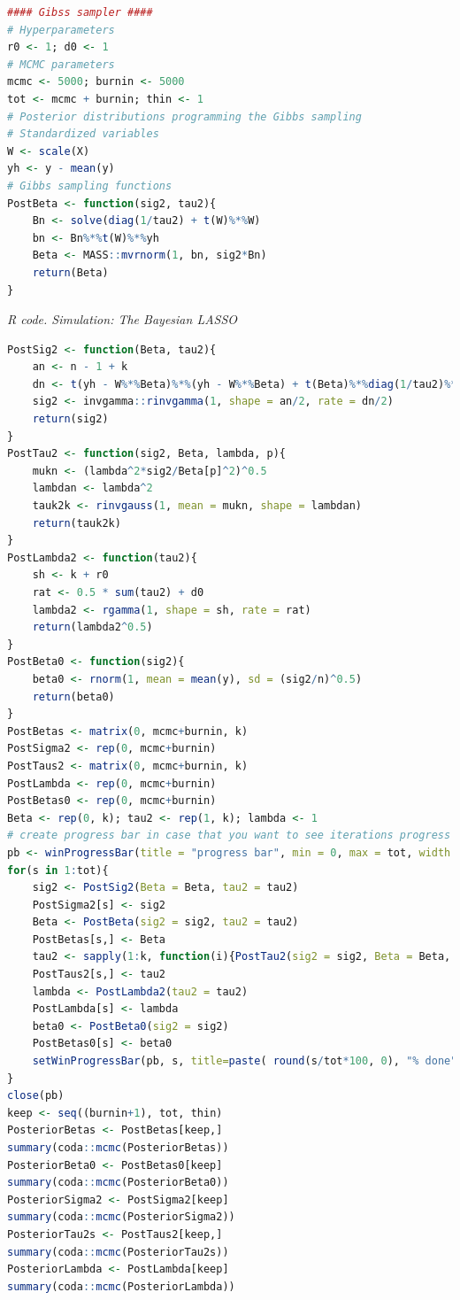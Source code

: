 \begin{enumerate}[leftmargin=*]
\begin{tcolorbox}[enhanced,width=4.67in,center upper,
	fontupper=\large\bfseries,drop shadow southwest,sharp corners]
\begin{VF}
\begin{lstlisting}[language=R]
#### Gibss sampler ####
# Hyperparameters
r0 <- 1; d0 <- 1
# MCMC parameters
mcmc <- 5000; burnin <- 5000
tot <- mcmc + burnin; thin <- 1
# Posterior distributions programming the Gibbs sampling
# Standardized variables
W <- scale(X)
yh <- y - mean(y)
# Gibbs sampling functions
PostBeta <- function(sig2, tau2){
	Bn <- solve(diag(1/tau2) + t(W)%*%W)
	bn <- Bn%*%t(W)%*%yh
	Beta <- MASS::mvrnorm(1, bn, sig2*Bn)
	return(Beta)
}
\end{lstlisting}
	\end{VF}
\end{tcolorbox} 
 
\begin{tcolorbox}[enhanced,width=4.67in,center upper,
	fontupper=\large\bfseries,drop shadow southwest,sharp corners]
	\textit{R code. Simulation: The Bayesian LASSO}
	\begin{VF}
		\begin{lstlisting}[language=R]
PostSig2 <- function(Beta, tau2){
	an <- n - 1 + k
	dn <- t(yh - W%*%Beta)%*%(yh - W%*%Beta) + t(Beta)%*%diag(1/tau2)%*%Beta
	sig2 <- invgamma::rinvgamma(1, shape = an/2, rate = dn/2)
	return(sig2)
}
PostTau2 <- function(sig2, Beta, lambda, p){
	mukn <- (lambda^2*sig2/Beta[p]^2)^0.5
	lambdan <- lambda^2
	tauk2k <- rinvgauss(1, mean = mukn, shape = lambdan)
	return(tauk2k)
}
PostLambda2 <- function(tau2){
	sh <- k + r0
	rat <- 0.5 * sum(tau2) + d0
	lambda2 <- rgamma(1, shape = sh, rate = rat)
	return(lambda2^0.5)
}
PostBeta0 <- function(sig2){
	beta0 <- rnorm(1, mean = mean(y), sd = (sig2/n)^0.5)
	return(beta0)
}
PostBetas <- matrix(0, mcmc+burnin, k)
PostSigma2 <- rep(0, mcmc+burnin)
PostTaus2 <- matrix(0, mcmc+burnin, k)
PostLambda <- rep(0, mcmc+burnin)
PostBetas0 <- rep(0, mcmc+burnin)
Beta <- rep(0, k); tau2 <- rep(1, k); lambda <- 1
# create progress bar in case that you want to see iterations progress
pb <- winProgressBar(title = "progress bar", min = 0, max = tot, width = 300)
for(s in 1:tot){
	sig2 <- PostSig2(Beta = Beta, tau2 = tau2)
	PostSigma2[s] <- sig2
	Beta <- PostBeta(sig2 = sig2, tau2 = tau2)
	PostBetas[s,] <- Beta
	tau2 <- sapply(1:k, function(i){PostTau2(sig2 = sig2, Beta = Beta, lambda = lambda, p = i)})
	PostTaus2[s,] <- tau2
	lambda <- PostLambda2(tau2 = tau2)
	PostLambda[s] <- lambda
	beta0 <- PostBeta0(sig2 = sig2)
	PostBetas0[s] <- beta0
	setWinProgressBar(pb, s, title=paste( round(s/tot*100, 0), "% done"))
}
close(pb)
keep <- seq((burnin+1), tot, thin)
PosteriorBetas <- PostBetas[keep,]
summary(coda::mcmc(PosteriorBetas))
PosteriorBeta0 <- PostBetas0[keep]
summary(coda::mcmc(PosteriorBeta0))
PosteriorSigma2 <- PostSigma2[keep]
summary(coda::mcmc(PosteriorSigma2))
PosteriorTau2s <- PostTaus2[keep,]
summary(coda::mcmc(PosteriorTau2s))
PosteriorLambda <- PostLambda[keep]
summary(coda::mcmc(PosteriorLambda))
\end{lstlisting}
	\end{VF}
\end{tcolorbox} 


\end{enumerate}
